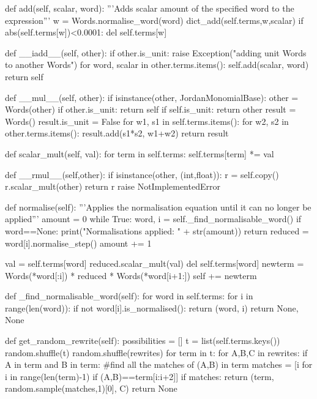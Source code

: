 \documentclass{article}
\begin{document}
\begin{python}
    
    def add(self, scalar, word):
        '''Adds scalar amount of the specified word to the expression'''
        w = Words.normalise_word(word)
        dict_add(self.terms,w,scalar)
        if abs(self.terms[w])<0.0001:
            del self.terms[w]
    
    def __iadd__(self, other):
        if other.is_unit:
            raise Exception("adding unit Words to another Words")
        for word, scalar in other.terms.items():
            self.add(scalar, word)
        return self

    def __mul__(self, other):
        if isinstance(other, JordanMonomialBase):
            other = Words(other)
        if other.is_unit: return self
        if self.is_unit: return other
        result = Words()
        result.is_unit = False
        for w1, s1 in self.terms.items():
            for w2, s2 in other.terms.items():
                result.add(s1*s2, w1+w2)
        return result

    def scalar_mult(self, val):
        for term in self.terms: self.terms[term] *= val

    def __rmul__(self,other):
        if isinstance(other, (int,float)):
            r = self.copy()
            r.scalar_mult(other)
            return r
        raise NotImplementedError

    def normalise(self):
        '''Applies the normalisation equation until it can no longer be applied'''
        amount = 0
        while True:
            word, i = self._find_normalisable_word()
            if word==None:
                print("Normalisations applied: " + str(amount))
                return
            reduced = word[i].normalise_step()
            amount += 1

            val = self.terms[word]
            reduced.scalar_mult(val)
            del self.terms[word]
            newterm = Words(*word[:i]) * reduced * Words(*word[i+1:])
            self += newterm

    def _find_normalisable_word(self):
        for word in self.terms:
            for i in range(len(word)):
                if not word[i].is_normalised():
                    return (word, i)
        return None, None
    

    def get_random_rewrite(self):
        possibilities = []
        t = list(self.terms.keys())
        random.shuffle(t)
        random.shuffle(rewrites)
        for term in t:
            for A,B,C in rewrites:
                if A in term and B in term:
                    #find all the matches of (A,B) in term
                    matches = [i for i in range(len(term)-1) if (A,B)==term[i:i+2]]
                    if matches:
                        return (term, random.sample(matches,1)[0], C)           
        return None


\end{python}
\end{document}
